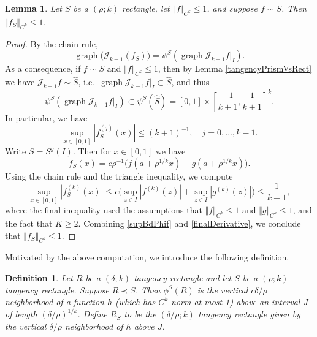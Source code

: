 \documentclass[letterpaper, reqno,11pt]{article}
\numberwithin{equation}{section}
\numberwithin{thm}{section}
\newtheorem{defn}[thm]{Definition}
\newtheorem{lem}[thm]{Lemma}
\theoremstyle{remark}
\begin{document}
\begin{lem}\label{CkNormRectangleRescaling}
Let $S$ be a $(\rho;k)$ rectangle, let $\Vert f\Vert_{C^k}\leq 1$, and suppose $f\sim S$. Then $\Vert f_S \Vert_{C^k}\leq 1$. 
\end{lem}
\begin{proof}
By the chain rule, 
\begin{equation}\label{intertwinePullback}
\operatorname{graph}\big(\mathcal{J}_{k-1}(f_S)\big) = \psi^{S}(\operatorname{graph}\mathcal{J}_{k-1} f|_I).
\end{equation}
%
As a consequence, if $f\sim S$ and $\Vert f \Vert_{C^k}\leq 1$, then by Lemma \ref{tangencyPrismVsRect} we have $\mathcal{J}_{k-1}f\sim \hat S$, i.e.~$\operatorname{graph}\mathcal{J}_{k-1} f|_I\subset \hat S$, and thus
\[
\psi^{S}(\operatorname{graph}\mathcal{J}_{k-1} f|_I) \subset \psi^{S}(\hat S) = [0,1]\times [\frac{-1}{k+1},\frac{1}{k+1}]^k.
\]
In particular, we have 
\begin{equation}\label{supBdPhif}
\sup_{x\in[0,1]} |f_S^{(j)}(x)|\leq (k+1)^{-1},\quad j=0,\ldots,k-1.
\end{equation}
Write $S = S^g(I)$. Then for $x\in[0,1]$ we have
\[
f_S(x) = c\rho^{-1}\big( f(a+\rho^{1/k}x) - g(a+\rho^{1/k}x)\big).
\]
Using the chain rule and the triangle inequality, we compute 
\begin{equation}\label{finalDerivative}
\sup_{x\in[0,1]} |f_S^{(k)}(x)|\leq c\big( \sup_{z\in I}|f^{(k)}(z)| + \sup_{z\in I}|g^{(k)}(z)| \big)\leq \frac{1}{k+1},
\end{equation}
where the final inequality used the assumptions that $\Vert f\Vert_{C^k}\leq 1$ and $\Vert g\Vert_{C^k}\leq 1$, and the fact that $K\geq 2$. Combining \eqref{supBdPhif} and \eqref{finalDerivative}, we conclude that $\Vert f_S \Vert_{C^k}\leq 1$. 

\end{proof}

Motivated by the above computation, we introduce the following definition.

\begin{defn}\label{defnCapPhiRect}
Let $R$ be a $(\delta;k)$ tangency rectangle and let $S$ be a $(\rho;k)$ tangency rectangle. Suppose $R\prec S$. Then $\phi^S(R)$ is the vertical $c \delta/\rho$ neighborhood of a function $h$ (which has $C^k$ norm at most 1) above an interval $J$ of length $(\delta/\rho)^{1/k}$. Define $R_S$ to be the $(\delta/\rho; k)$  tangency rectangle given by the vertical $\delta/\rho$ neighborhood of $h$ above $J$.
\end{defn} 
\end{document}
